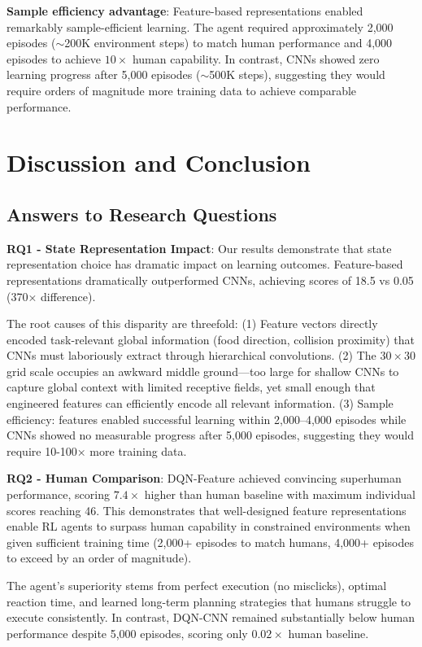 \documentclass[10pt,a4paper,twocolumn]{article}
\begin{document}
\textbf{Sample efficiency advantage}: Feature-based representations enabled remarkably sample-efficient learning. The agent required approximately 2,000 episodes ($\sim$200K environment steps) to match human performance and 4,000 episodes to achieve $10\times$ human capability. In contrast, CNNs showed zero learning progress after 5,000 episodes ($\sim$500K steps), suggesting they would require orders of magnitude more training data to achieve comparable performance.

\section{Discussion and Conclusion}

\subsection{Answers to Research Questions}

\textbf{RQ1 - State Representation Impact}: Our results demonstrate that state representation choice has dramatic impact on learning outcomes. Feature-based representations dramatically outperformed CNNs, achieving scores of 18.5 vs 0.05 (370× difference). 

The root causes of this disparity are threefold: (1) Feature vectors directly encoded task-relevant global information (food direction, collision proximity) that CNNs must laboriously extract through hierarchical convolutions. (2) The $30 \times 30$ grid scale occupies an awkward middle ground---too large for shallow CNNs to capture global context with limited receptive fields, yet small enough that engineered features can efficiently encode all relevant information. (3) Sample efficiency: features enabled successful learning within 2,000--4,000 episodes while CNNs showed no measurable progress after 5,000 episodes, suggesting they would require 10-100× more training data.

\textbf{RQ2 - Human Comparison}: DQN-Feature achieved convincing superhuman performance, scoring $7.4\times$ higher than human baseline with maximum individual scores reaching 46. This demonstrates that well-designed feature representations enable RL agents to surpass human capability in constrained environments when given sufficient training time (2,000+ episodes to match humans, 4,000+ episodes to exceed by an order of magnitude). 

The agent's superiority stems from perfect execution (no misclicks), optimal reaction time, and learned long-term planning strategies that humans struggle to execute consistently. In contrast, DQN-CNN remained substantially below human performance despite 5,000 episodes, scoring only $0.02\times$ human baseline.
\end{document}
